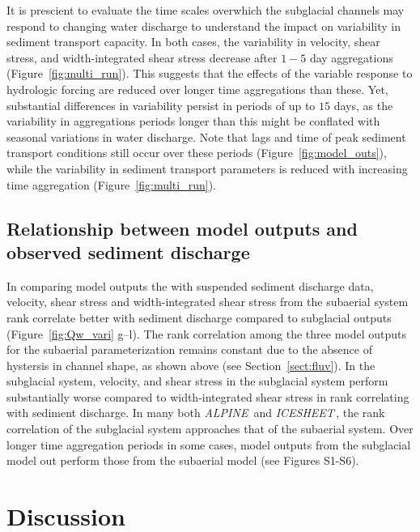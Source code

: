 \documentclass[11pt]{article}
\newcommand{\alpine}{\textit{ALPINE}\,}
\newcommand{\icesheet}{\textit{ICESHEET}\,}
\begin{document}
It is prescient to evaluate the time scales overwhich the subglacial channels may respond to changing water discharge to understand the impact on variability in sediment transport capacity.
In both cases, the variability in velocity, shear stress, and width-integrated shear stress decrease after $1-5$ day aggregations (Figure~\ref{fig:multi_run}).
This suggests that the effects of the variable response to hydrologic forcing are reduced over longer time aggregations than these.
Yet, substantial differences in variability persist in periods of up to $15$ days, as the variability in aggregations periods longer than this might be conflated with seasonal variations in water discharge.
Note that lags and time of peak sediment transport conditions still occur over these periods (Figure~\ref{fig:model_outs}), while the variability in sediment transport parameters is reduced with increasing time aggregation (Figure~\ref{fig:multi_run}).

\subsection{Relationship between model outputs and observed sediment discharge}

In comparing model outputs the with suspended sediment discharge data, velocity, shear stress and width-integrated shear stress from the subaerial system rank correlate better with sediment discharge compared to subglacial outputs (Figure~\ref{fig:Qw_vari} g--l).
The rank correlation among the three model outputs for the subaerial parameterization remains constant due to the absence of hystersis in channel shape, as shown above (see Section~\ref{sect:fluv}).
In the subglacial system, velocity, and shear stress in the subglacial system perform substantially worse compared to width-integrated shear stress in rank correlating with sediment discharge.
In many both \alpine{} and \icesheet{}, the rank correlation of the subglacial system approaches that of the subaerial system.
Over longer time aggregation periods in some cases, model outputs from the subglacial model out perform those from the subaerial model (see Figures S1-S6).


\section{Discussion}
\end{document}
